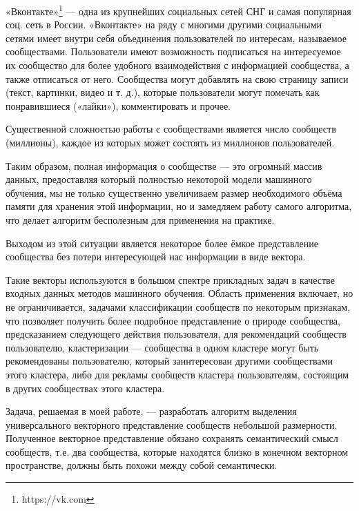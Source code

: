 \documentclass[times,specification,annotation]{itmo-student-thesis}
\begin{document}
«Вконтакте»\footnote{https://vk.com} --- одна из крупнейших социальных сетей СНГ и самая
популярная соц. сеть в России. «Вконтакте» на ряду с многими другими
социальными сетями имеет внутри себя объединения пользователей по интересам,
называемое сообществами. Пользователи имеют возможность подписаться на
интересуемое их сообщество для более удобного взаимодействия с информацией
сообщества, а также отписаться от него. Сообщества могут добавлять на свою
страницу записи (текст, картинки, видео и т. д.), которые пользователи могут
помечать как понравившиеся («лайки»), комментировать и прочее.

Существенной сложностью работы с сообществами является число сообществ (миллионы), каждое из которых может состоять из миллионов пользователей.  

Таким образом, полная информация о сообществе --- это огромный массив
данных, предоставляя который полностью некоторой модели машинного обучения,
мы не только существенно увеличиваем размер необходимого объёма памяти для хранения этой информации, но и замедляем работу самого алгоритма, что делает алгоритм бесполезным для применения на практике.

Выходом из этой ситуации является некоторое более ёмкое представление сообщества без потери интересующей нас информации в виде вектора.

Такие векторы используются в большом спектре прикладных задач в качестве входных данных методов машинного обучения. Область применения включает, но не ограничивается, задачами классификации сообществ по некоторым признакам, что позволяет получить более подробное представление о природе сообщества, предсказанием следующего действия пользователя, для рекомендаций сообществ пользователю, кластеризации --- сообщества в одном кластере могут быть рекомендованы пользователю, который заинтересован другими сообществами этого кластера, либо для рекламы сообществ кластера пользователям, состоящим в других сообществах этого кластера. 

Задача, решаемая в моей работе, --- разработать алгоритм выделения универсального векторного представление сообществ небольшой размерности. Полученное векторное представление обязано сохранять семантический смысл сообществ, т.е. два сообщества, которые находятся близко в конечном векторном пространстве, должны быть похожи между собой семантически. 

\end{document}
